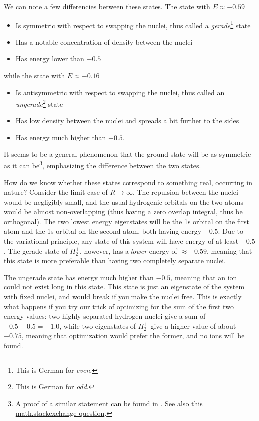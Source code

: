 \documentclass{article}
\begin{document}
We can note a few differencies between these states. The state with \(E\approx-0.59\)

\begin{itemize}
\item Is symmetric with respect to swapping the nuclei, thus called a \textit{gerade}\footnote{This is German for \textit{even}.} state
\item Has a notable concentration of density between the nuclei
\item Has energy lower than \(-0.5\)
\end{itemize}

while the state with \(E\approx-0.16\)

\begin{itemize}
\item Is antisymmetric with respect to swapping the nuclei, thus called an \textit{ungerade}\footnote{This is German for \textit{odd}.} state
\item Has low density between the nuclei and spreads a bit further to the sides
\item Has energy much higher than \(-0.5\).
\end{itemize}

It seems to be a general phenomenon that the ground state will be as symmetric as it can be\footnote{A proof of a similar statement can be found in \cite{ref:lieb}. See also \href{https://math.stackexchange.com/questions/3564003/if-psi-is-an-eigenvector-of-delta-is-psi-an-eigenvector-as-well}{this math.stackexchange question}.}, emphasizing the difference between the two states.

 How do we know whether these states correspond to something real, occurring in nature? Consider the limit case of \(R \rightarrow \infty\). The repulsion between the nuclei would be negligibly small, and the usual hydrogenic orbitals on the two atoms would be almost non-overlapping (thus having a zero overlap integral, thus be orthogonal). The two lowest energy eigenstates will be the 1s orbital on the first atom and the 1s orbital on the second atom, both having energy \(-0.5\). Due to the variational principle, any state of this system will have energy of at least \(-0.5\). The gerade state of \(H_2^+\), however, has a \textit{lower} energy of \(\approx-0.59\), meaning that this state is more preferable than having two completely separate nuclei.

 The ungerade state has energy much higher than \(-0.5\), meaning that an ion could not exist long in this state. This state is just an eigenstate of the system with fixed nuclei, and would break if you make the nuclei free. This is exactly what happens if you try our trick of optimizing for the sum of the first two energy values: two highly separated hydrogen nuclei give a sum of \(-0.5-0.5=-1.0\), while two eigenstates of \(H_2^+\) give a higher value of about \(-0.75\), meaning that optimization would prefer the former, and no ions will be found.
\end{document}
